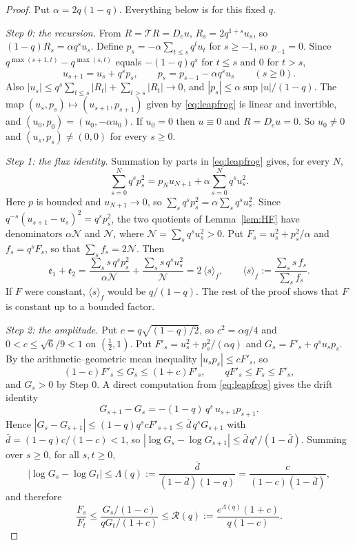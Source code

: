 \documentclass[11pt]{article}
\theoremstyle{plain}
\theoremstyle{definition}
\theoremstyle{remark}
\begin{document}
\begin{proof}
Put $\alpha=2q(1-q)$. Everything below is for this fixed $q$.

\emph{Step 0: the recursion.} From $R=\mathcal TR=D_eu$, $R_s=2q^{1+s}u_s$, so
$(1-q)R_s=\alpha q^su_s$. Define $p_s=-\alpha\sum_{t\le s}q^tu_t$ for $s\ge-1$, so $p_{-1}=0$. Since
$q^{\max(s+1,t)}-q^{\max(s,t)}$ equals $-(1-q)q^s$ for $t\le s$ and $0$ for $t>s$,
\begin{equation}\label{eq:leapfrog}
   u_{s+1}=u_s+q^sp_s,\qquad p_s=p_{s-1}-\alpha q^su_s\qquad(s\ge0).
\end{equation}
Also $|u_s|\le q^s\sum_{t\le s}|R_t|+\sum_{t>s}|R_t|\to0$, and $|p_s|\le\alpha\sup|u|/(1-q)$. The map
$(u_s,p_s)\mapsto(u_{s+1},p_{s+1})$ given by \eqref{eq:leapfrog} is linear and invertible, and
$(u_0,p_0)=(u_0,-\alpha u_0)$. If $u_0=0$ then $u\equiv0$ and $R=D_eu=0$. So $u_0\ne0$ and
$(u_s,p_s)\ne(0,0)$ for every $s\ge0$.

\emph{Step 1: the flux identity.} Summation by parts in \eqref{eq:leapfrog} gives, for every $N$,
\[
   \sum_{s=0}^Nq^sp_s^2=p_Nu_{N+1}+\alpha\sum_{s=0}^Nq^su_s^2 .
\]
Here $p$ is bounded and $u_{N+1}\to0$, so $\sum_sq^sp_s^2=\alpha\sum_sq^su_s^2$. Since
$q^{-s}(u_{s+1}-u_s)^2=q^sp_s^2$, the two quotients of Lemma~\ref{lem:HF} have denominators
$\alpha\mathcal N$ and $\mathcal N$, where $\mathcal N=\sum_sq^su_s^2>0$. Put
$F_s=u_s^2+p_s^2/\alpha$ and $f_s=q^sF_s$, so that $\sum_sf_s=2\mathcal N$. Then
\[
   \mathfrak e_1+\mathfrak e_2=\frac{\sum_ss\,q^sp_s^2}{\alpha\mathcal N}
   +\frac{\sum_ss\,q^su_s^2}{\mathcal N}=2\,\langle s\rangle_f,\qquad
   \langle s\rangle_f:=\frac{\sum_ss\,f_s}{\sum_sf_s}.
\]
If $F$ were constant, $\langle s\rangle_f$ would be $q/(1-q)$. The rest of the proof shows that $F$ is
constant up to a bounded factor.

\emph{Step 2: the amplitude.} Put $c=q\sqrt{(1-q)/2}$, so $c^2=\alpha q/4$ and $0<c\le\sqrt6/9<1$ on
$(\tfrac12,1)$. Put $F'_s=u_s^2+p_s^2/(\alpha q)$ and $G_s=F'_s+q^su_sp_s$. By the
arithmetic--geometric mean inequality $|u_sp_s|\le cF'_s$, so
\[
   (1-c)F'_s\le G_s\le(1+c)F'_s,\qquad qF'_s\le F_s\le F'_s,
\]
and $G_s>0$ by Step 0. A direct computation from \eqref{eq:leapfrog} gives the drift identity
\[
   G_{s+1}-G_s=-(1-q)\,q^s\,u_{s+1}p_{s+1}.
\]
Hence $|G_s-G_{s+1}|\le(1-q)q^scF'_{s+1}\le\bar d\,q^sG_{s+1}$ with $\bar d=(1-q)c/(1-c)<1$, so
$|\log G_s-\log G_{s+1}|\le\bar d\,q^s/(1-\bar d)$. Summing over $s\ge0$, for all $s,t\ge0$,
\[
   |\log G_s-\log G_t|\le\Lambda(q):=\frac{\bar d}{(1-\bar d)(1-q)}=\frac{c}{(1-c)(1-\bar d)},
\]
and therefore
\[
   \frac{F_s}{F_t}\le\frac{G_s/(1-c)}{qG_t/(1+c)}\le\mathcal R(q):=\frac{e^{\Lambda(q)}(1+c)}{q(1-c)} .
\]


\end{proof}
\end{document}
